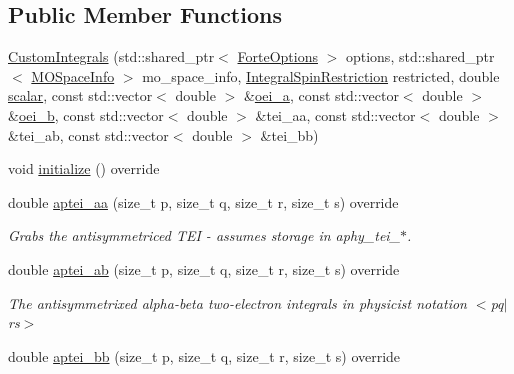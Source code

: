 \subsection*{Public Member Functions}
\begin{DoxyCompactItemize}
\item 
\mbox{\hyperlink{classforte_1_1_custom_integrals_ae7a71673fc56be09c26fae459f7bc84e}{Custom\+Integrals}} (std\+::shared\+\_\+ptr$<$ \mbox{\hyperlink{classforte_1_1_forte_options}{Forte\+Options}} $>$ options, std\+::shared\+\_\+ptr$<$ \mbox{\hyperlink{classforte_1_1_m_o_space_info}{M\+O\+Space\+Info}} $>$ mo\+\_\+space\+\_\+info, \mbox{\hyperlink{namespaceforte_a7defa2660dd3eb07aa81176b90781be7}{Integral\+Spin\+Restriction}} restricted, double \mbox{\hyperlink{classforte_1_1_forte_integrals_a7e2dec148b4e6c3bbd918df8025f8329}{scalar}}, const std\+::vector$<$ double $>$ \&\mbox{\hyperlink{classforte_1_1_forte_integrals_adeb8d675248cb181a502818b8a972908}{oei\+\_\+a}}, const std\+::vector$<$ double $>$ \&\mbox{\hyperlink{classforte_1_1_forte_integrals_ace33795c89d99da0aa8bac4a95263d23}{oei\+\_\+b}}, const std\+::vector$<$ double $>$ \&tei\+\_\+aa, const std\+::vector$<$ double $>$ \&tei\+\_\+ab, const std\+::vector$<$ double $>$ \&tei\+\_\+bb)
\item 
void \mbox{\hyperlink{classforte_1_1_custom_integrals_a09375e296a39feb6a94c7cf4947d0206}{initialize}} () override
\item 
double \mbox{\hyperlink{classforte_1_1_custom_integrals_a933807bd0f7a711329edb83b9b9915f0}{aptei\+\_\+aa}} (size\+\_\+t p, size\+\_\+t q, size\+\_\+t r, size\+\_\+t s) override
\begin{DoxyCompactList}\small\item\em Grabs the antisymmetriced T\+EI -\/ assumes storage in aphy\+\_\+tei\+\_\+$\ast$. \end{DoxyCompactList}\item 
double \mbox{\hyperlink{classforte_1_1_custom_integrals_abfea37dad8b705e35732f3fae06dd151}{aptei\+\_\+ab}} (size\+\_\+t p, size\+\_\+t q, size\+\_\+t r, size\+\_\+t s) override
\begin{DoxyCompactList}\small\item\em The antisymmetrixed alpha-\/beta two-\/electron integrals in physicist notation $<$pq$\vert$rs$>$ \end{DoxyCompactList}\item 
double \mbox{\hyperlink{classforte_1_1_custom_integrals_a2f10a8117087972091b1a7b7188bf797}{aptei\+\_\+bb}} (size\+\_\+t p, size\+\_\+t q, size\+\_\+t r, size\+\_\+t s) override

\end{DoxyCompactItemize}
